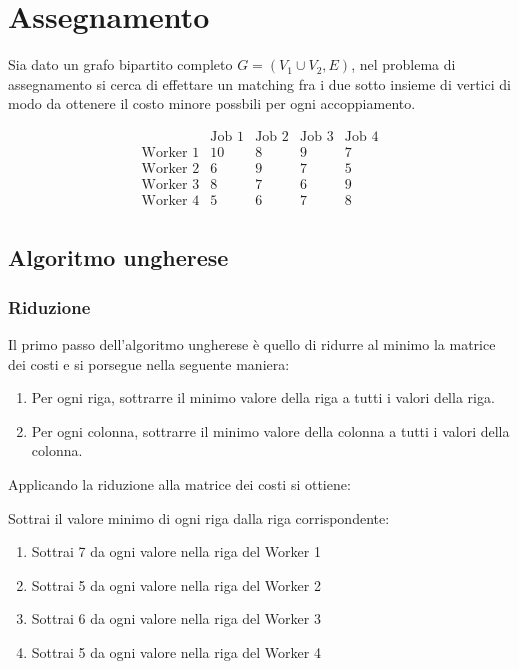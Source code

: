 \chapter{Assegnamento}

Sia dato un grafo bipartito completo $G = (V_1 \cup V_2, E)$,
nel problema di assegnamento si cerca di effettare un matching fra i due sotto insieme di 
vertici di modo da ottenere il costo minore possbili per ogni accoppiamento.


\[
\begin{array}{c|cccc}
      & \text{Job 1} & \text{Job 2} & \text{Job 3} & \text{Job 4} \\
\hline
\text{Worker 1} & 10 & 8 & 9 & 7 \\
\text{Worker 2} & 6 & 9 & 7 & 5 \\
\text{Worker 3} & 8 & 7 & 6 & 9 \\
\text{Worker 4} & 5 & 6 & 7 & 8 \\
\end{array}
\]


\section{Algoritmo ungherese}
\subsection{Riduzione}
Il primo passo dell'algoritmo ungherese \`e quello di ridurre al minimo la matrice dei costi e si porsegue nella seguente maniera:

\begin{enumerate}
  \item Per ogni riga, sottrarre il minimo valore della riga a tutti i valori della riga.
  \item Per ogni colonna, sottrarre il minimo valore della colonna a tutti i valori della colonna.
\end{enumerate}


Applicando la riduzione alla matrice dei costi si ottiene:

Sottrai il valore minimo di ogni riga dalla riga corrispondente:
\begin{enumerate}
   \item Sottrai 7 da ogni valore nella riga del Worker 1
   \item Sottrai 5 da ogni valore nella riga del Worker 2
   \item Sottrai 6 da ogni valore nella riga del Worker 3
   \item Sottrai 5 da ogni valore nella riga del Worker 4
\end{enumerate}

